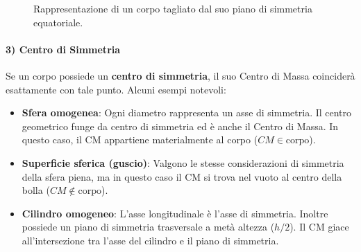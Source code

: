 \begin{figure}[ht]
    \centering
    \caption{Rappresentazione di un corpo tagliato dal suo piano di simmetria equatoriale.}
\end{figure}

\paragraph{3) Centro di Simmetria}
Se un corpo possiede un \textbf{centro di simmetria}, il suo Centro di Massa coinciderà esattamente con tale punto.
Alcuni esempi notevoli:
\begin{itemize}
    \item \textbf{Sfera omogenea}: Ogni diametro rappresenta un asse di simmetria. Il centro geometrico funge da centro di simmetria ed è anche il Centro di Massa. In questo caso, il CM appartiene materialmente al corpo ($CM \in \text{corpo}$).
    \item \textbf{Superficie sferica (guscio)}: Valgono le stesse considerazioni di simmetria della sfera piena, ma in questo caso il CM si trova nel vuoto al centro della bolla ($CM \notin \text{corpo}$).
    \item \textbf{Cilindro omogeneo}: L'asse longitudinale è l'asse di simmetria. Inoltre possiede un piano di simmetria trasversale a metà altezza ($h/2$). Il CM giace all'intersezione tra l'asse del cilindro e il piano di simmetria.
\end{itemize}

